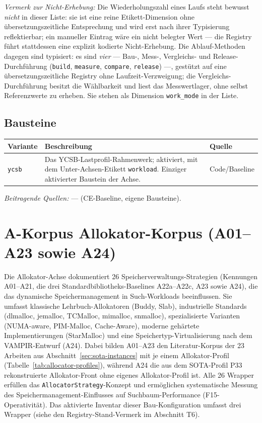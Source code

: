 \emph{Vermerk zur Nicht-Erhebung:} Die Wiederholungszahl eines Laufs steht bewusst \emph{nicht} in dieser Liste: sie ist eine reine Etikett-Dimension ohne übersetzungszeitliche Entsprechung und wird erst nach ihrer Typisierung reflektierbar; ein manueller Eintrag wäre ein nicht belegter Wert --- die Registry führt stattdessen eine explizit kodierte Nicht-Erhebung. Die Ablauf-Methoden dagegen sind typisiert: es sind \emph{vier} --- Bau-, Mess-, Vergleichs- und Release-Durchführung (\texttt{build}, \texttt{measure}, \texttt{compare}, \texttt{release}) ---, gestützt auf eine übersetzungszeitliche Registry ohne Laufzeit-Verzweigung; die Vergleichs-Durchführung besitzt die Wählbarkeit und liest das Messwertlager, ohne selbst Referenzwerte zu erheben. Sie stehen als Dimension \texttt{work\_\allowbreak{}mode} in der Liste.

\subsection*{Bausteine}

\begin{scriptsize}
\begin{longtable}{@{}>{\raggedright\arraybackslash}p{2.4cm} >{\raggedright\arraybackslash}p{7.6cm} >{\raggedright\arraybackslash}p{3.5cm}@{}}
\toprule
Variante & Beschreibung & Quelle \\
\midrule
\endhead%
\texttt{ycsb} & Das YCSB-Lastprofil-Rahmenwerk; aktiviert, mit dem Unter-Achsen-Etikett \texttt{workload}. Einziger aktivierter Baustein der Achse. & Code/\allowbreak{}Baseline \\
\bottomrule
\end{longtable}
\end{scriptsize}

\emph{Beitragende Quellen:} --- (CE-Baseline, eigene Bausteine).

\section{A-Korpus Allokator-Korpus (A01--A23 sowie A24)}

Die Allokator-Achse dokumentiert 26 Speicherverwaltungs-Strategien (Kennungen A01--A21, die drei Standardbibliotheks-Baselines A22a--A22c, A23 sowie A24), die das dynamische Speichermanagement in Such-Workloads beeinflussen. Sie umfasst klassische Lehrbuch-Allokatoren (Buddy, Slab), industrielle Standards (dlmalloc, jemalloc, TCMalloc, mimalloc, snmalloc), spezialisierte Varianten (NUMA-aware, PIM-Malloc, Cache-Aware), moderne gehärtete Implementierungen (Star\allowbreak{}Malloc) und eine Speichertyp-Virtualisierung nach dem VAMPIR-Entwurf (A24). Dabei bilden A01--A23 den Literatur-Korpus der 23 Arbeiten aus Abschnitt~\ref{sec:sota-instances} mit je einem Allokator-Profil (Tabelle~\ref{tab:allocator-profiles}), während A24 die aus dem SOTA-Profil P33 rekonstruierte Allokator-Front ohne eigenes Allokator-Profil ist. Alle 26 Wrapper erfüllen das \texttt{Allocator\allowbreak{}Strategy}-Konzept und ermöglichen systematische Messung des Speichermanagement-Einflusses auf Suchbaum-Performance (F15-Operativität). Das aktivierte Inventar dieser Bau-Konfiguration umfasst drei Wrapper (siehe den Registry-Stand-Vermerk im Abschnitt T6).

